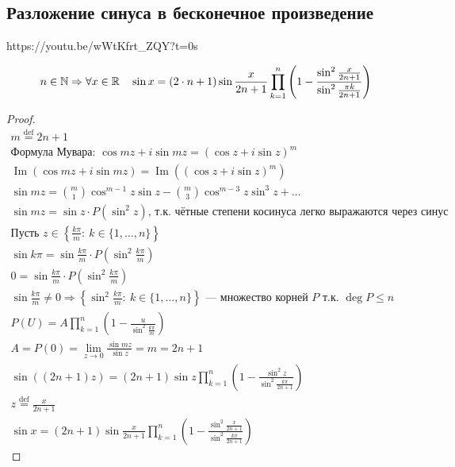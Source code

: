\documentclass[../main.tex]{subfiles}
\begin{document}
\subsection{Разложение синуса в бесконечное произведение}
https://youtu.be/wWtKfrt\_ZQY?t=0s
\begin{lemma}
\begin{equation*}
    n \in \operatorname*{\mathbb{N}} \Rightarrow \forall x \in \mathbb{R} \quad \sin x =
    (2 \cdot n + 1) \sin \frac{x}{2n + 1}
    \prod_{k=1}^{n}\left(1 - \frac{\sin^2 \frac{x}{2n + 1}}{\sin^2 \frac{\pi k}{2n + 1}}\right)
\end{equation*}
\begin{proof}
\begin{gather*}
    m \overset{\text{def}}{=}2n+1 \\
    \text{Формула Мувара: } \cos mz + i \sin mz= (\cos z + i \sin z)^m \\
    \operatorname{Im}(\cos mz + i \sin mz) = \operatorname{Im}\left(\left(\cos z + i \sin z\right)^m\right)\\
    \sin mz = \binom{m}{1}\cos^{m-1}z\sin z -  \binom{m}{3}\cos^{m-3}z\sin^3 z + \dots\\
    \sin mz = \sin z \cdot P\left(\sin^2 z\right)\text{, т.к. чётные степени косинуса легко выражаются через синус}\\
    \text{Пусть } z \in\left\{\frac{k\pi}{m}:\ k\in\{1,\dots,n\}\right\} \\
    \sin k\pi = \sin \frac{k\pi}{m} \cdot P\left(\sin^2 \frac{k\pi}{m}\right)\\
    0 = \sin \frac{k\pi}{m} \cdot P\left(\sin^2 \frac{k\pi}{m}\right)\\
    \sin\frac{k\pi}{m}\neq 0 \Rightarrow \left\{\sin^2\frac{k\pi}{m}:\ k\in\{1,\dots,n\}\right\}
    \text{~--- множество корней }P\text{ т.к. }\deg P \le n\\
    P(U)=A\prod_{k=1}^{n}\left(1-\frac{u}{\sin^2\frac{k\pi}{m}}\right)\\
    A=P(0)=\lim_{z \to 0}\frac{\sin mz}{\sin z}=m=2n+1 \\
    \sin \left((2n+1) z\right) = (2n+1) \sin z \prod_{k=1}^{n}\left(1-\frac{\sin^2 z}{\sin^2\frac{k\pi}{2n+1}}\right)\\
    z \overset{\text{def}}{=}\frac{x}{2n+1}\\
    \sin x=(2n+1)\sin\frac{x}{2n+1}\prod_{k=1}^{n}\left(1-\frac{\sin^2 \frac{x}{2n+1}}{\sin^2\frac{k\pi}{2n+1}}\right)
\end{gather*}
\end{proof}
\end{lemma}
\end{document}
